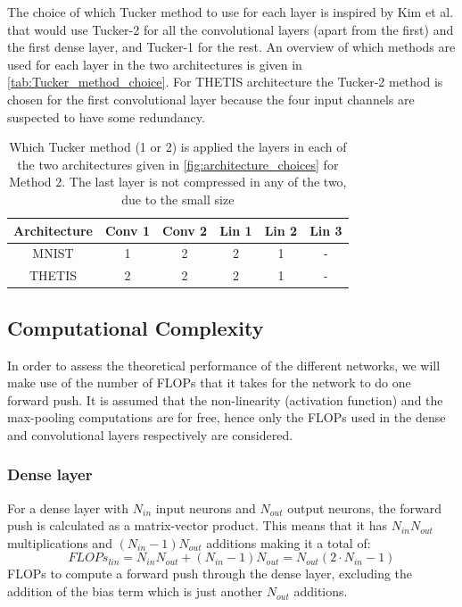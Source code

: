 The choice of which Tucker method to use for each layer is inspired by Kim et al.\cite{Kim2016} that would use Tucker-2 for all the convolutional layers (apart from the first) and the first dense layer, and Tucker-1 for the rest. An overview of which methods are used for each layer in the two architectures is given in \autoref{tab:Tucker_method_choice}. For THETIS architecture the Tucker-2 method is chosen for the first convolutional layer because the four input channels are suspected to have some redundancy.
\begin{table}[H]
\centering
\captionsetup{width=.95\linewidth}
\caption{Which Tucker method (1 or 2) is applied the layers in each of the two architectures given in \autoref{fig:architecture_choices} for Method 2. The last layer is not compressed in any of the two, due to the small size }
\label{tab:Tucker_method_choice}
\begin{tabular}{c|ccccc}
\textbf{Architecture} & Conv 1 & Conv 2 & Lin 1 & Lin 2 & Lin 3 \\ \hline
MNIST                                                    & 1      & 2      & 2     & 1     & -     \\
THETIS                                                   & 2      & 2      & 2     & 1     & -    
\end{tabular}
\end{table}

\subsection{Computational Complexity}\label{tex:computational_complexity}
In order to assess the theoretical performance of the different networks, we will make use of the number of FLOPs that it takes for the network to do one forward push. It is assumed that the non-linearity (activation function) and the max-pooling computations are for free, hence only the FLOPs used in the dense and convolutional layers respectively are considered.

\subsubsection{Dense layer}
For a dense layer with $N_{in}$ input neurons and $N_{out}$ output neurons, the forward push is calculated as a matrix-vector product. This means that it has $N_{in}N_{out}$ multiplications and $(N_{in}-1)N_{out}$ additions making it a total of:
\begin{equation}
    FLOPs_{lin} = N_{in}N_{out} + (N_{in}-1)N_{out} = N_{out} (2\cdot N_{in}-1)
\end{equation}
FLOPs to compute a forward push through the dense layer, excluding the addition of the bias term which is just another $N_{out}$ additions.


